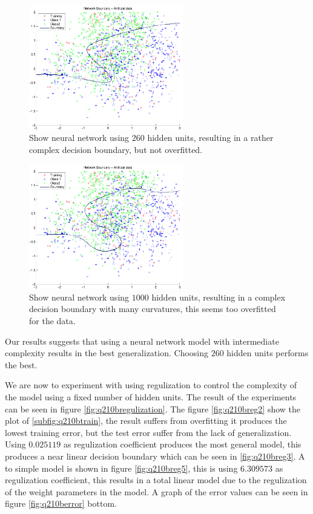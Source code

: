 \begin{figure}[!htbp]
  \centering
  \includegraphics[width=0.6\textwidth]{./images/q210a_Nh260}
  \caption{Show neural network using $260$ hidden units, resulting in
    a rather complex decision boundary, but not overfitted.}
  \label{fig:q210Nh260}
\end{figure}

\begin{figure}[!htbp]
  \centering
  \includegraphics[width=0.6\textwidth]{./images/q210a_Nh1000}
  \caption{Show neural network using $1000$ hidden units, resulting in
    a complex decision boundary with many curvatures, this seems too
    overfitted for the data.}
  \label{fig:q210Nh1000}
\end{figure}

Our results suggests that using a neural network model with
intermediate complexity results in the best generalization. Choosing
$260$ hidden units performs the best.

We are now to experiment with using regulization to control the
complexity of the model using a fixed number of hidden units. The
result of the experiments can be seen in figure
\ref{fig:q210bregulization}. The figure \ref{fig:q210breg2} show the
plot of \ref{subfig:q210btrain}, the result suffers from overfitting
it produces the lowest training error, but the test error suffer from
the lack of generalization. Using $0.025119$ as regulization
coefficient produces the most general model, this produces a near
linear decision boundary which can be seen in \ref{fig:q210breg3}. A
to simple model is shown in figure \ref{fig:q210breg5}, this is using
$6.309573$ as regulization coefficient, this results in a total linear
model due to the regulization of the weight parameters in the model. A
graph of the error values can be seen in figure \ref{fig:q210berror}
bottom.

